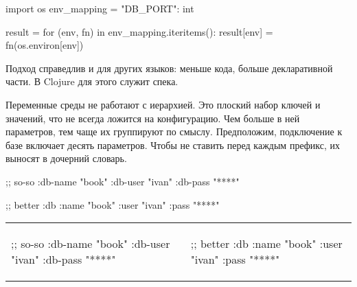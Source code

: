 \begin{english}
  \begin{python}
import os
env_mapping = {"DB_PORT": int}

result = {}
for (env, fn) in env_mapping.iteritems():
    result[env] = fn(os.environ[env])
  \end{python}
\end{english}

Подход справедлив и для других языков: меньше кода, больше декларативной
части. В Clojure для этого служит спека.

Переменные среды не работают с иерархией. Это плоский набор ключей и значений,
что не всегда ложится на конфигурацию. Чем больше в ней параметров, тем чаще их
группируют по смыслу. Предположим, подключение к базе включает десять
параметров. Чтобы не ставить перед каждым префикс, их выносят в дочерний
словарь.


\ifnarrow

\begin{english}
  \begin{clojure}
;; so-so
{:db-name "book"
 :db-user "ivan"
 :db-pass "****"}
  \end{clojure}

\splitter

  \begin{clojure}
;; better
{:db {:name "book"
      :user "ivan"
      :pass "****"}}
  \end{clojure}
\end{english}

\else

\begin{english}

\noindent
\begin{tabular}{ @{}p{5cm} @{}p{5cm} }

  \begin{clojure}
;; so-so
{:db-name "book"
 :db-user "ivan"
 :db-pass "****"}
  \end{clojure}

&

  \begin{clojure}
;; better
{:db {:name "book"
      :user "ivan"
      :pass "****"}}
  \end{clojure}

\end{tabular}

\end{english}

